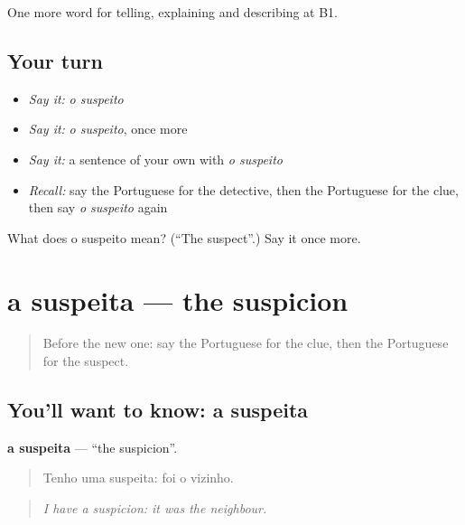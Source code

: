 \begin{grammarlens}[title={What you've built}]
One more word for telling, explaining and describing at B1.
\end{grammarlens}

\subsection*{Your turn}
\begin{itemize}
\raggedright
  \item \emph{Say it:} \emph{o suspeito}
  \item \emph{Say it:} \emph{o suspeito}, once more
  \item \emph{Say it:} a sentence of your own with \emph{o suspeito}
  \item \emph{Recall:} say the Portuguese for the detective, then the Portuguese for the clue, then say \emph{o suspeito} again
\end{itemize}

\begin{tcolorbox}[breakable,colback=teal!4,colframe=teal!35!black,title={Before you move on}]
What does o suspeito mean? (\textquotedblleft{}The suspect\textquotedblright{}.) Say it once more.
\end{tcolorbox}
\section[a suspeita]{a suspeita — the suspicion}

\label{lesson:PT-C295-suspeita}



\begin{quote}
Before the new one: say the Portuguese for the clue, then the Portuguese for the suspect.
\end{quote}

\subsection*{You'll want to know: a suspeita}
\textbf{a suspeita} — \textquotedblleft{}the suspicion\textquotedblright{}.

\begin{quote}
Tenho uma suspeita: foi o vizinho.
\end{quote}

\begin{quote}
\emph{I have a suspicion: it was the neighbour.}
\end{quote}

